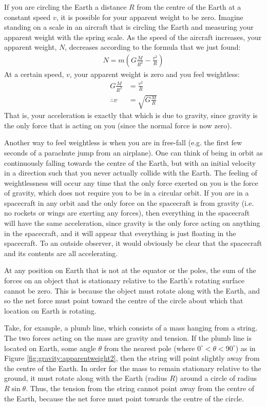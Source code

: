 If you are circling the Earth a distance $R$ from the centre of the Earth at a constant speed $v$, it is possible for your apparent weight to be zero. Imagine standing on a scale in an aircraft that is circling the Earth and measuring your apparent weight with the spring scale. As the speed of the aircraft increases, your apparent weight, $N$, decreases according to the formula that we just found:
\begin{align*}
N=m\left(G\frac{M}{R^2} - \frac{v^2}{R}  \right)
\end{align*}
At a certain speed, $v$, your apparent weight is zero and you feel weightless:
\begin{align*}
G\frac{M}{R^2} &= \frac{v^2}{R}\\
\therefore v&= \sqrt{G\frac{M}{R} }
\end{align*}
That is, your acceleration is exactly that which is due to gravity, since gravity is the only force that is acting on you (since the normal force is now zero).

Another way to feel weightless is when you are in free-fall (e.g. the first few seconds of a parachute jump from an airplane). One can think of being in orbit as continuously falling towards the centre of the Earth, but with an initial velocity in a direction such that you never actually collide with the Earth. The feeling of weightlessness will occur any time that the only force exerted on you is the force of gravity, which does not require you to be in a circular orbit. If you are in a spacecraft in any orbit and the only force on the spacecraft is from gravity (i.e. no rockets or wings are exerting any forces), then everything in the spacecraft will have the same acceleration, since gravity is the only force acting on anything in the spacecraft, and it will appear that everything is just floating in the spacecraft. To an outside observer, it would obviously be clear that the spacecraft and its contents are all accelerating.

At any position on Earth that is not at the equator or the poles, the sum of the forces on an object that is stationary relative to the Earth's rotating surface cannot be zero. This is because the object must rotate along with the Earth, and so the net force must point toward the centre of the circle about which that location on Earth is rotating. 

Take, for example, a plumb line, which consists of a mass hanging from a string. The two forces acting on the mass are gravity and tension. 
If the plumb line is located on Earth, some angle $\theta$ from the nearest pole (where $0^{\circ}<\theta<90^{\circ}$) as in Figure \ref{fig:gravity:apparentweight2}, then the string will point slightly away from the centre of the Earth. In order for the mass to remain stationary relative to the ground, it must rotate along with the Earth (radius $R$) around a circle of radius $R\sin\theta$. Thus, the tension from the string cannot point away from the centre of the Earth, because the net force must point towards the centre of the circle.


